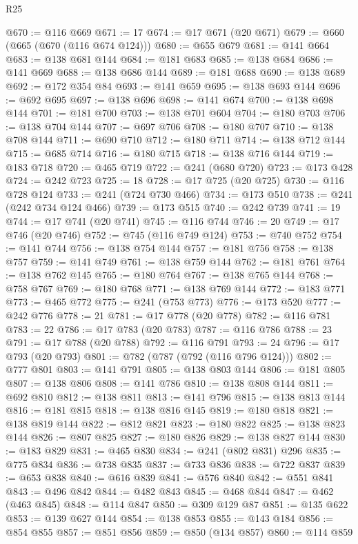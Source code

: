 \begin{lexlean}{R25}
\begin{coremodule}
@670 := @116 @669
@671 := 17
@674 := @17 @671 (@20 @671)
@679 := @660 (@665 (@670 (@116 @674 @124)))
@680 := @655 @679
@681 := @141 @664
@683 := @138 @681 @144
@684 := @181 @683
@685 := @138 @684
@686 := @141 @669
@688 := @138 @686 @144
@689 := @181 @688
@690 := @138 @689
@692 := @172 @354 @84
@693 := @141 @659
@695 := @138 @693 @144
@696 := @692 @695
@697 := @138 @696
@698 := @141 @674
@700 := @138 @698 @144
@701 := @181 @700
@703 := @138 @701 @604
@704 := @180 @703
@706 := @138 @704 @144
@707 := @697 @706
@708 := @180 @707
@710 := @138 @708 @144
@711 := @690 @710
@712 := @180 @711
@714 := @138 @712 @144
@715 := @685 @714
@716 := @180 @715
@718 := @138 @716 @144
@719 := @183 @718
@720 := @465 @719
@722 := @241 (@680 @720)
@723 := @173 @428
@724 := @242 @723
@725 := 18
@728 := @17 @725 (@20 @725)
@730 := @116 @728 @124
@733 := @241 (@724 @730 @466)
@734 := @173 @510
@738 := @241 (@242 @734 @124 @466)
@739 := @173 @515
@740 := @242 @739
@741 := 19
@744 := @17 @741 (@20 @741)
@745 := @116 @744
@746 := 20
@749 := @17 @746 (@20 @746)
@752 := @745 (@116 @749 @124)
@753 := @740 @752
@754 := @141 @744
@756 := @138 @754 @144
@757 := @181 @756
@758 := @138 @757
@759 := @141 @749
@761 := @138 @759 @144
@762 := @181 @761
@764 := @138 @762 @145
@765 := @180 @764
@767 := @138 @765 @144
@768 := @758 @767
@769 := @180 @768
@771 := @138 @769 @144
@772 := @183 @771
@773 := @465 @772
@775 := @241 (@753 @773)
@776 := @173 @520
@777 := @242 @776
@778 := 21
@781 := @17 @778 (@20 @778)
@782 := @116 @781
@783 := 22
@786 := @17 @783 (@20 @783)
@787 := @116 @786
@788 := 23
@791 := @17 @788 (@20 @788)
@792 := @116 @791
@793 := 24
@796 := @17 @793 (@20 @793)
@801 := @782 (@787 (@792 (@116 @796 @124)))
@802 := @777 @801
@803 := @141 @791
@805 := @138 @803 @144
@806 := @181 @805
@807 := @138 @806
@808 := @141 @786
@810 := @138 @808 @144
@811 := @692 @810
@812 := @138 @811
@813 := @141 @796
@815 := @138 @813 @144
@816 := @181 @815
@818 := @138 @816 @145
@819 := @180 @818
@821 := @138 @819 @144
@822 := @812 @821
@823 := @180 @822
@825 := @138 @823 @144
@826 := @807 @825
@827 := @180 @826
@829 := @138 @827 @144
@830 := @183 @829
@831 := @465 @830
@834 := @241 (@802 @831) @296
@835 := @775 @834
@836 := @738 @835
@837 := @733 @836
@838 := @722 @837
@839 := @653 @838
@840 := @616 @839
@841 := @576 @840
@842 := @551 @841
@843 := @496 @842
@844 := @482 @843
@845 := @468 @844
@847 := @462 (@463 @845)
@848 := @114 @847
@850 := @309 @129 @87
@851 := @135 @622
@853 := @139 @627 @144
@854 := @138 @853
@855 := @143 @184
@856 := @854 @855
@857 := @851 @856
@859 := @850 (@134 @857)
@860 := @114 @859

\end{coremodule}
\end{lexlean}
